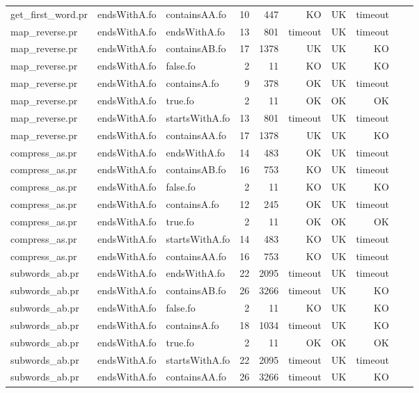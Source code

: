 \begin{tabular}{l|l|l|r|r|r|r|r|r|r}
get\_first\_word.pr & endsWithA.fo & containsAA.fo & 10 & 447 & KO & 
UK & timeout \\
map\_reverse.pr & endsWithA.fo & endsWithA.fo & 13 & 801 & timeout & 
UK & timeout \\
map\_reverse.pr & endsWithA.fo & containsAB.fo & 17 & 1378 & UK & 
UK & KO \\
map\_reverse.pr & endsWithA.fo & false.fo & 2 & 11 & KO & 
UK & KO \\
map\_reverse.pr & endsWithA.fo & containsA.fo & 9 & 378 & OK & 
UK & timeout \\
map\_reverse.pr & endsWithA.fo & true.fo & 2 & 11 & OK & 
OK & OK \\
map\_reverse.pr & endsWithA.fo & startsWithA.fo & 13 & 801 & timeout & 
UK & timeout \\
map\_reverse.pr & endsWithA.fo & containsAA.fo & 17 & 1378 & UK & 
UK & KO \\
compress\_as.pr & endsWithA.fo & endsWithA.fo & 14 & 483 & OK & 
UK & timeout \\
compress\_as.pr & endsWithA.fo & containsAB.fo & 16 & 753 & KO & 
UK & timeout \\
compress\_as.pr & endsWithA.fo & false.fo & 2 & 11 & KO & 
UK & KO \\
compress\_as.pr & endsWithA.fo & containsA.fo & 12 & 245 & OK & 
UK & timeout \\
compress\_as.pr & endsWithA.fo & true.fo & 2 & 11 & OK & 
OK & OK \\
compress\_as.pr & endsWithA.fo & startsWithA.fo & 14 & 483 & KO & 
UK & timeout \\
compress\_as.pr & endsWithA.fo & containsAA.fo & 16 & 753 & KO & 
UK & timeout \\
subwords\_ab.pr & endsWithA.fo & endsWithA.fo & 22 & 2095 & timeout & 
UK & timeout \\
subwords\_ab.pr & endsWithA.fo & containsAB.fo & 26 & 3266 & timeout & 
UK & KO \\
subwords\_ab.pr & endsWithA.fo & false.fo & 2 & 11 & KO & 
UK & KO \\
subwords\_ab.pr & endsWithA.fo & containsA.fo & 18 & 1034 & timeout & 
UK & KO \\
subwords\_ab.pr & endsWithA.fo & true.fo & 2 & 11 & OK & 
OK & OK \\
subwords\_ab.pr & endsWithA.fo & startsWithA.fo & 22 & 2095 & timeout & 
UK & timeout \\
subwords\_ab.pr & endsWithA.fo & containsAA.fo & 26 & 3266 & timeout & 
UK & KO \\

\end{tabular}
